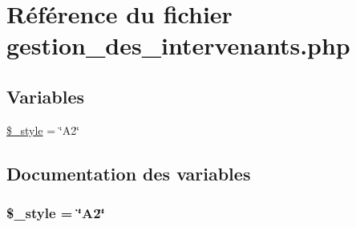 \hypertarget{gestion__des__intervenants_8php}{
\section{R\'{e}f\'{e}rence du fichier gestion\_\-des\_\-intervenants.php}
\label{gestion__des__intervenants_8php}
}
\subsection*{Variables}
\begin{CompactItemize}
\item 
\hyperlink{gestion__des__intervenants_8php_a0}{\$\_\-style} = \char`\"{}A2\char`\"{}
\end{CompactItemize}


\subsection{Documentation des variables}
\hypertarget{gestion__des__intervenants_8php_a0}{
\subsubsection[\$\_\-style]{\setlength{\rightskip}{0pt plus 5cm}\$\_\-style = \char`\"{}A2\char`\"{}}}
\label{gestion__des__intervenants_8php_a0}



